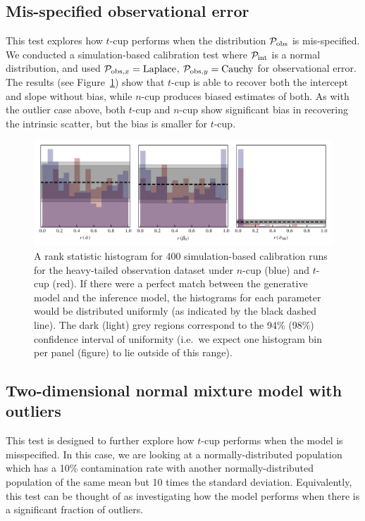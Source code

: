 \documentclass[fleqn,usenatbib]{rasti}
\begin{document}
\subsection{Mis-specified observational error}

This test explores how $t$-cup performs when the distribution $\mathcal P_{\rm
obs}$ is mis-specified. We conducted a simulation-based calibration test where
$\mathcal P_{\rm int}$ is a normal distribution, and used $\mathcal P_{{\rm
obs}, x} = {\rm Laplace}$, $\mathcal P_{{\rm obs}, y} = {\rm Cauchy}$ for
observational error. The results (see Figure~\ref{fig:results.obs.sbc}) show
that $t$-cup is able to recover both the intercept and slope without bias, while
$n$-cup produces biased estimates of both. As with the outlier case above, both
$t$-cup and $n$-cup show significant bias in recovering the intrinsic scatter,
but the bias is smaller for $t$-cup.

\begin{figure}
    \includegraphics[width=\textwidth]{graphics/sbc/mixed_obs_sbc.pdf}
    \caption{A rank statistic histogram for 400 simulation-based calibration
    runs for the heavy-tailed observation dataset under $n$-cup (blue) and
    $t$-cup (red). If there were a perfect match between the generative model
    and the inference model, the histograms for each parameter would be
    distributed uniformly (as indicated by the black dashed line). The dark
    (light) grey regions correspond to the 94\% (98\%) confidence interval of
    uniformity (i.e.\ we expect one histogram bin per panel (figure) to lie
    outside of this range).}
    \label{fig:results.obs.sbc}
\end{figure}

\subsection{Two-dimensional normal mixture model with outliers}
\label{sec:results.gmm}

This test is designed to further explore how $t$-cup performs when the model is
misspecified. In this case, we are looking at a normally-distributed population
which has a 10\% contamination rate with another normally-distributed population
of the same mean but 10 times the standard deviation. Equivalently, this test
can be thought of as investigating how the model performs when there is a
significant fraction of outliers.
\end{document}
